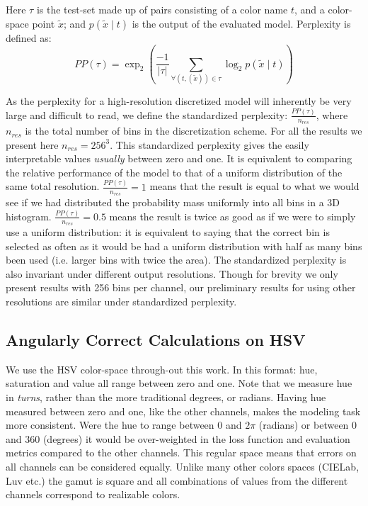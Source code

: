 \documentclass[]{clv3}
\newcommand{\parencite}{\citep}
\begin{document}
Here $\tau$ is the test-set made up of pairs consisting of a color name $t$, and a color-space point $\tilde{x}$;
and  $p(\tilde{x}\mid t)$ is the output of the evaluated model.
Perplexity is defined as:
\begin{equation}
PP(\tau) = \exp_2{\left(
	\frac{-1}{|\tau|} 
	\sum_{
		\forall(t,(\tilde{x})) \in \tau}
	\log_2 p(\tilde{x}\mid t)\right)}
\end{equation}

As the perplexity for a high-resolution discretized model will inherently be very large and difficult to read,
we define the standardized perplexity: $\frac{PP(\tau)}{n_{res}}$,
where $n_{res}$ is the total number of bins in the discretization scheme.
For all the results we present here $n_{res} = 256^3$.
This standardized perplexity gives the easily interpretable values \emph{usually} between zero and one.
It is equivalent to comparing the relative performance of the model to that of a uniform distribution of the same total resolution.
$\frac{PP(\tau)}{n_{res}}=1$ means that the result is equal to what we would see if we had distributed the probability mass uniformly into all bins in a 3D histogram.
$\frac{PP(\tau)}{n_{res}}=0.5$ means the result is twice as good as if we were to simply use a uniform distribution: it is equivalent to saying that the correct bin is selected as often as it would be had a uniform distribution with half as many bins been used (i.e. larger bins with twice the area).
The standardized perplexity is also invariant under different output resolutions.
Though for brevity we only  present results with 256 bins per channel, our preliminary results for using other resolutions are similar under standardized perplexity.


\subsection{Angularly Correct Calculations on HSV}\label{sec:angularly-correct}
We use the HSV color-space \parencite{smith1978color} through-out this work.
In this format: hue, saturation and value all range between zero and one.
Note that we measure hue in \emph{turns}, rather than the more traditional degrees, or radians.
Having hue measured between zero and one, like the other channels, makes the modeling task more consistent.
Were the hue to range between $0$ and $2\pi$ (radians) or between $0$ and $360$ (degrees) it would be over-weighted in the loss function and evaluation metrics compared to the other channels.
This regular space means that errors on all channels can be considered equally.
Unlike many other colors spaces (CIELab, Luv etc.) the gamut is square and all combinations of values from the different channels correspond to realizable colors.
\end{document}
